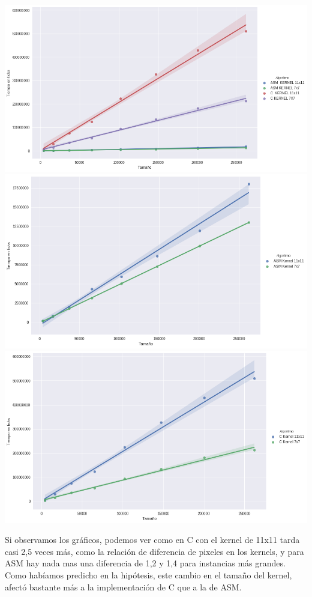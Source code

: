\begin{center} 
\includegraphics[scale=0.5]{img/maxCloser_KERNEL.png}
\includegraphics[scale=0.5]{img/maxCloser_KERNEL_ASM.png}
\includegraphics[scale=0.5]{img/maxCloser_KERNEL_C.png}
\end{center}

Si observamos los gráficos, podemos ver como en C con el kernel de 11x11 tarda casi 2,5 veces más, como la relación de diferencia de pixeles en los kernels, y para ASM hay nada mas una diferencia de 1,2 y 1,4 para instancias más grandes. Como habíamos predicho en la hipótesis, este cambio en el tamaño del kernel, afectó bastante más a la implementación de C que a la de ASM.

